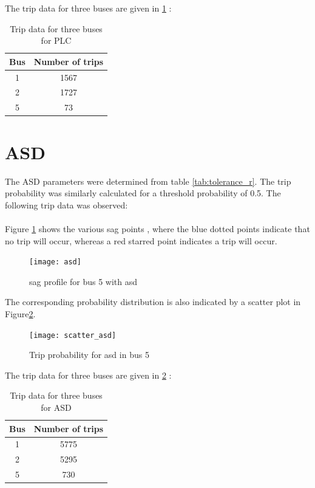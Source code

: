 \documentclass[17pt,a4paper]{extreport}
\begin{document}
	 The trip data for three buses are given in \ref{tab:PLC_res} :
 \begin{center}
 \begin{table}
 \centering
 \begin{tabular}{|c|c|}
 \hline 
 Bus & Number of trips \\ \hline
 1 & 1567 \\ \hline
 2 &  1727\\ \hline
 5 & 73	\\ \hline
 
 \end{tabular}
 \caption{Trip data for three buses for PLC}
 \label{tab:PLC_res}
 \end{table}
 
 \end{center}
	 \section[ASD]{ASD}
	 The ASD parameters were determined from table \ref{tab:tolerance_r}. The trip probability was similarly calculated for a threshold probability of 0.5. The following trip data was observed: 
	 \paragraph{ } Figure \ref{fig:asd_sag_5} shows the various sag points , where the blue dotted points indicate that no trip will occur, whereas a red starred point indicates a trip will occur.
	\begin{figure}[!h]
		\texttt{[image: asd]}
		\caption{sag profile for bus 5 with asd}
		\label{fig:asd_sag_5}
	\end{figure}
	The corresponding probability distribution is also indicated by a scatter plot in Figure\ref{fig:scatter_asd_5}.
	\begin{figure}[!h]
	\texttt{[image: scatter\_asd]}
	\caption{Trip probability for asd in bus 5}
	\label{fig:scatter_asd_5}
\end{figure}	
The trip data for three buses are given in \ref{tab:ASD_res} :
 \begin{center}
 \begin{table}
 \centering
 \begin{tabular}{|c|c|}
 \hline 
 Bus & Number of trips \\ \hline
 1 & 5775 \\ \hline
 2 & 5295 \\ \hline
 5 & 730	\\ \hline
 
 \end{tabular}
  \caption{Trip data for three buses for ASD}
 \label{tab:ASD_res}
 \end{table}

 \end{center}
\end{document}
